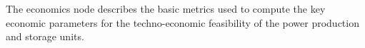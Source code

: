 The economics node describes the basic metrics used to compute the key economic parameters for the techno-economic feasibility of the power production and storage units.
